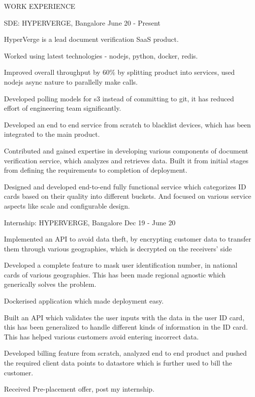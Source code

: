 \documentclass{resume} %
\begin{document}
\begin{rSection}{ WORK EXPERIENCE }

\begin{rSubsection}{ SDE: HYPERVERGE, Bangalore} {June 20 - Present}{}
    
    \item HyperVerge is a lead document verification SaaS product.
    \item Worked using latest technologies - nodejs, python, docker, redis.
    \item Improved overall throughput by 60\% by splitting product into services, used nodejs async nature to parallelly make calls.
    \item Developed polling models for s3 instead of committing to git, it has reduced effort of engineering team significantly.
    \item Developed an end to end service from scratch to blacklist devices, which has been integrated to the main product.
    \item Contributed and gained expertise in developing various components of document verification service, which analyzes and retrieves data. Built it from initial stages from defining the requirements to completion of deployment.
    \item Designed and developed end-to-end fully functional service which categorizes ID cards based on their quality into different buckets. And focused on various service aspects like scale and configurable design.
    
\end{rSubsection}

\begin{rSubsection}{ Internship: HYPERVERGE, Bangalore} {Dec 19 - June 20}{}
    
    \item Implemented an API to avoid data theft, by encrypting customer data to transfer them through various geographies, which is decrypted on the receivers' side
    \item Developed a complete feature to mask user identification number, in national cards of various geographies. This has been made regional agnostic which generically solves the problem.
    \item Dockerised application which made deployment easy.
    \item Built an API which validates the user inputs with the data in the user ID card, this has been generalized to handle different kinds of information in the ID card. This has helped various customers avoid entering incorrect data.
    \item Developed billing feature from scratch, analyzed end to end product and pushed the required client data points to datastore which is further used to bill the customer.
    \item Received Pre-placement offer, post my internship.
    \\
    

\end{rSubsection}
\end{rSection}
\end{document}
